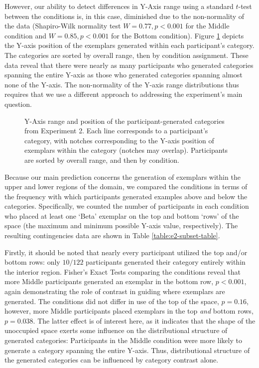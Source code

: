 \documentclass[12pt]{article}
\newcommand\inputpgf[2]{{
\let\pgfimageWithoutPath\pgfimage
\renewcommand{\pgfimage}[2][]{\pgfimageWithoutPath[##1]{#1/##2}}

}}
\begin{document}
\begin{flushleft}
However, our ability to detect differences in Y-Axis range using a standard
$t$-test between the conditions is, in this case, diminished due to the
non-normality of the data (Shapiro-Wilk normality test $W=0.77, p< 0.001$ for
the Middle condition and $W=0.85, p < 0.001$ for the Bottom condition). Figure
\ref{fig:e2-yranges} depicts the Y-axis position of the exemplars generated
within each participant's category. The categories are sorted by overall range,
then by condition assignment. These data reveal that there were nearly as many
participants who generated categories spanning the entire Y-axis as those who
generated categories spanning almost none of the Y-axis. The non-normality of
the Y-axis range distributions thus requires that we use a different approach to
addressing the experiment's main question.

\begin{figure}
    \begin{center} \inputpgf{figs/}{e2-yranges.pgf}
    \caption{Y-Axis range and position of the participant-generated categories
from Experiment 2. Each line corresponds to a participant's category, with
notches corresponding to the Y-axis position of exemplars within the category
(notches may overlap). Participants are sorted by overall range, and then by
condition. }
    \label{fig:e2-yranges}
    \end{center}
\end{figure}

Because our main prediction concerns the generation of exemplars within the
upper and lower regions of the domain, we compared the conditions in terms of
the frequency with which participants generated examples above and below the
categories. Specifically, we counted the number of participants in each
condition who placed at least one `Beta' exemplar on the top and bottom `rows'
of the space (the maximum and minimum possible Y-axis value, respectively). The
resulting contingencies data are shown in Table \ref{table:e2-subset-table}.

Firstly, it should be noted that nearly every participant utilized the top
and/or bottom rows: only $10 / 122$ participants generated their category
entirely within the interior region. Fisher's Exact Tests comparing the
conditions reveal that more Middle participants generated an exemplar in the
bottom row, $p < 0.001$, again demonstrating the role of contrast in guiding
where exemplars are generated. The conditions did not differ in use of the top
of the space, $p = 0.16$, however, more Middle participants placed exemplars in
the top {\em and} bottom rows, $p = 0.038$. The latter effect is of interest
here, as it indicates that the shape of the unoccupied space exerts some
influence on the distributional structure of generated categories: Participants
in the Middle condition were more likely to generate a category spanning the
entire Y-axis. Thus, distributional structure of the generated categories can be
influenced by category contrast alone.


\end{flushleft}
\end{document}
